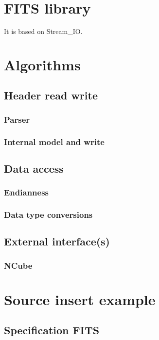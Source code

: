 \documentclass[a4paper,10pt]{article}
\begin{document}
\tableofcontents

\section{FITS library}

It is based on Stream\_IO.

\section{Algorithms}

\subsection{Header read write}
\subsubsection{Parser}
\subsubsection{Internal model and write}

\subsection{Data access}
\subsubsection{Endianness}
\subsubsection{Data type conversions}

\subsection{External interface(s)}
\subsubsection{NCube}



\section{Source insert example}

\subsection{Specification FITS}
\end{document}
